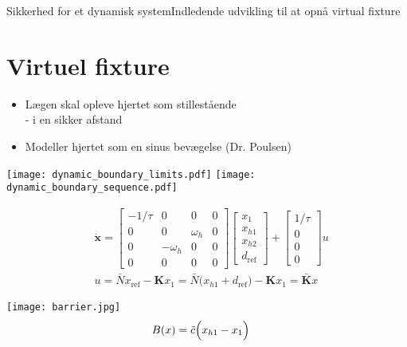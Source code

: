 \begin{frame}{Sikkerhed for et dynamisk system}{Indledende udvikling til at opnå virtual fixture}
\section{Virtuel fixture}
\vspace*{-0.2cm}
\begin{block}{}
	\begin{itemize}
		\item Lægen skal opleve hjertet som stillestående \\
		\scriptsize - i en sikker afstand
		\item \normalsize Modeller hjertet som en sinus bevægelse (Dr. Poulsen)
	\end{itemize}
\end{block}
\texttt{[image: dynamic\_boundary\_limits.pdf]} \hspace*{0.4cm}
\texttt{[image: dynamic\_boundary\_sequence.pdf]}

\begin{minipage}{0.7\textwidth}
\scriptsize
\begin{align*}
& \dot{\textbf{x}} = \begin{bmatrix}
-1/\tau & 0 & 0 & 0 \\
0 & 0 & \omega_h & 0 \\
0 & -\omega_h & 0 & 0 \\
0 & 0 & 0 & 0
\end{bmatrix} \begin{bmatrix}
x_1 \\ x_{h1} \\ x_{h2} \\ d_\text{ref}
\end{bmatrix} + \begin{bmatrix}
1/\tau \\ 0 \\ 0 \\ 0
\end{bmatrix} u \\
&  u = \bar{N} x_\text{ref} - \textbf{K} x_1 = \bar{N}\Big( x_{h1} + d_\text{ref} \Big) - \textbf{K} x_1 = \bar{\textbf{K}}x
\end{align*}
\end{minipage}
\hspace*{0.1cm}
\begin{minipage}{0.25\textwidth}
\vspace*{0.2cm}
\texttt{[image: barrier.jpg]}
\hspace*{-0.3cm}
\vspace*{-0.2cm} \scriptsize
\begin{align*}
B(x) = \tilde{c}\Big( x_{h1} - x_1 \Big){\color{white}{lol}}
\end{align*}
\end{minipage}
\end{frame}

